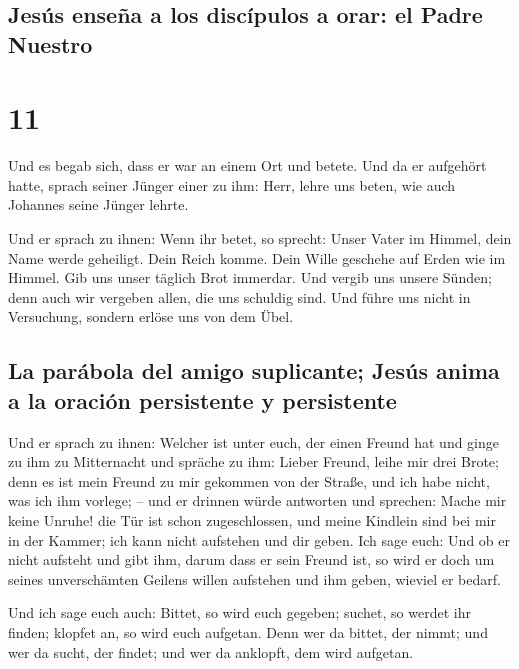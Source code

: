 \hypertarget{jesuxfas-enseuxf1a-a-los-discuxedpulos-a-orar-el-padre-nuestro}{%
\subsection{Jesús enseña a los discípulos a orar: el Padre
Nuestro}\label{jesuxfas-enseuxf1a-a-los-discuxedpulos-a-orar-el-padre-nuestro}}

\hypertarget{section-10}{%
\section{11}\label{section-10}}

 Und es begab sich, dass er war an einem Ort und betete.
Und da er aufgehört hatte, sprach seiner Jünger einer zu ihm: Herr,
lehre uns beten, wie auch Johannes seine Jünger lehrte.

 Und er sprach zu ihnen: Wenn ihr betet, so sprecht: Unser
Vater im Himmel, dein Name werde geheiligt. Dein Reich komme. Dein Wille
geschehe auf Erden wie im Himmel.  Gib uns unser täglich
Brot immerdar.  Und vergib uns unsere Sünden; denn auch
wir vergeben allen, die uns schuldig sind. Und führe uns nicht in
Versuchung, sondern erlöse uns von dem Übel.

\hypertarget{la-paruxe1bola-del-amigo-suplicante-jesuxfas-anima-a-la-oraciuxf3n-persistente-y-persistente}{%
\subsection{La parábola del amigo suplicante; Jesús anima a la oración
persistente y
persistente}\label{la-paruxe1bola-del-amigo-suplicante-jesuxfas-anima-a-la-oraciuxf3n-persistente-y-persistente}}

 Und er sprach zu ihnen: Welcher ist unter euch, der einen
Freund hat und ginge zu ihm zu Mitternacht und spräche zu ihm: Lieber
Freund, leihe mir drei Brote;  denn es ist mein Freund zu
mir gekommen von der Straße, und ich habe nicht, was ich ihm vorlege; --
 und er drinnen würde antworten und sprechen: Mache mir
keine Unruhe! die Tür ist schon zugeschlossen, und meine Kindlein sind
bei mir in der Kammer; ich kann nicht aufstehen und dir geben.
 Ich sage euch: Und ob er nicht aufsteht und gibt ihm,
darum dass er sein Freund ist, so wird er doch um seines unverschämten
Geilens willen aufstehen und ihm geben, wieviel er bedarf.

 Und ich sage euch auch: Bittet, so wird euch gegeben;
suchet, so werdet ihr finden; klopfet an, so wird euch aufgetan.
 Denn wer da bittet, der nimmt; und wer da sucht, der
findet; und wer da anklopft, dem wird aufgetan.

